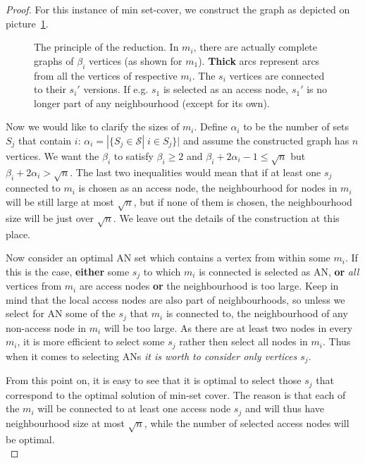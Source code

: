 \begin{proof}
			\noindent For this instance of min set-cover, we construct the graph as depicted on picture~\ref{fig:reduction}.
			 
			\begin{figure}[h!]
				\begin{center}
				\end{center}
				\caption{\label{fig:reduction} The principle of the reduction. In $m_{i}$, there are actually complete graphs of $\beta_{i}$ vertices (as shown for $m_{1}$). \textbf{Thick} arcs represent arcs from all the vertices of respective $m_{i}$. The $s_{i}$ vertices are connected to their $s_{i}'$ versions. If e.g. $s_{1}$ is selected as an access node, $s_{1}'$ is no longer part of any neighbourhood (except for its own).}
			\end{figure}
			
			\noindent Now we would like to clarify the sizes of $m_{i}$. Define $\alpha_{i}$ to be the number of sets $S_{j}$ that contain $i$: $\alpha_{i} = |\{S_{j} \in \mathcal{S}| \; i \in S_{j}\}|$ and assume the constructed graph has $n$ vertices. We want the $\beta_{i}$ to satisfy $\beta_{i} \geq 2$ and $\beta_{i} + 2\alpha_{i} - 1 \leq \sqrt{n}$ but $\beta_{i} + 2\alpha_{i} > \sqrt{n}$. The last two inequalities would mean that if at least one $s_{j}$ connected to $m_{i}$ is chosen as an access node, the neighbourhood for nodes in $m_{i}$ will be still large at most $\sqrt{n}$, but if none of them is chosen, the neighbourhood size will be just over $\sqrt{n}$. We leave out the details of the construction at this place. 
			
			Now consider an optimal AN set which contains a vertex from within some $m_{i}$. If this is the case, \textbf{either} some $s_{j}$ to which $m_{i}$ is connected is selected as AN, \textbf{or} \textit{all} vertices from $m_{i}$ are access nodes \textbf{or} the neighbourhood is too large. Keep in mind that the local access nodes are also part of neighbourhoods, so unless we select for AN some of the $s_{j}$ that $m_{i}$ is connected to, the neighbourhood of any non-access node in $m_{i}$ will be too large. As there are at least two nodes in every $m_{i}$, it is more efficient to select some $s_{j}$ rather then select all nodes in $m_{i}$. Thus when it comes to selecting ANs \textit{it is worth to consider only vertices $s_{j}$}.
			
			From this point on, it is easy to see that it is optimal to select those $s_{j}$ that correspond to the optimal solution of min-set cover. The reason is that each of the $m_{i}$ will be connected to at least one access node $s_{j}$ and will thus have neighbourhood size at most $\sqrt{n}$, while the number of selected access nodes will be optimal. \\
			

\end{proof}
